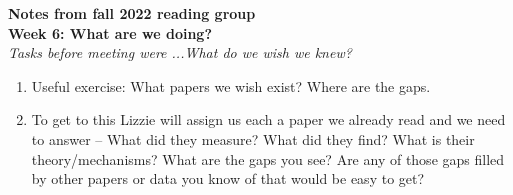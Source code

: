 \documentclass[11pt,letter]{article}
\begin{document}

\renewcommand{\refname}{\CHead{}}

{\bf \large Notes from fall 2022 reading group}\\

{\bf Week 6: What are we doing?}\\

\emph{Tasks before meeting were ...What do we wish we knew?}
\begin{enumerate}
\item Useful exercise: What papers we wish exist? Where are the gaps. 
\item To get to this Lizzie will assign us each a paper we already read and we need to answer -- What did they measure? What did they find? What is their theory/mechanisms? What are the gaps you see? Are any of those gaps filled by other papers or data you know of that would be easy to get? 
\end{enumerate}
\end{document}
